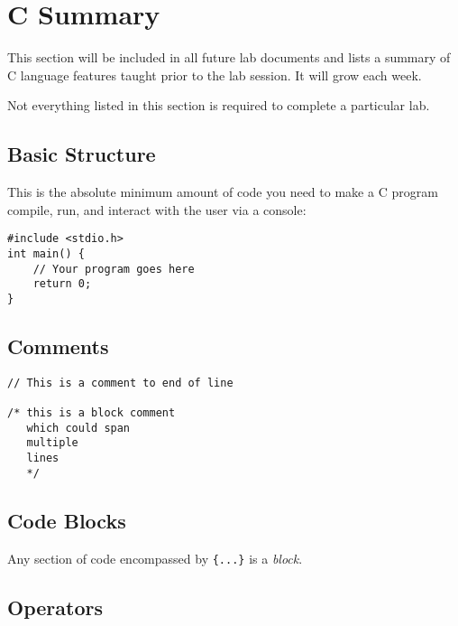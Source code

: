 \documentclass{lab}
\begin{document}
\pagebreak 
\section{C Summary}
This section will be included in all future lab documents and lists a summary of C language features taught prior to the lab session. It will grow each week.

Not everything listed in this section is required to complete a particular lab.

\begin{multicols}{2}
\subsection{Basic Structure}
This is the absolute minimum amount of code you need to make a C program compile, run, and interact with the user via a console:
\begin{lstlisting}[style=CStyle]
#include <stdio.h>
int main() {
	// Your program goes here
	return 0;
}
\end{lstlisting}
\subsection{Comments}
\begin{lstlisting}[style=CStyle]
// This is a comment to end of line

/* this is a block comment
   which could span
   multiple
   lines
   */
\end{lstlisting}

\subsection{Code Blocks}

Any section of code encompassed by \texttt{\{...\}} is a \textit{block}.

\subsection{Operators}\label{sec:operators}


\end{multicols}
\end{document}
